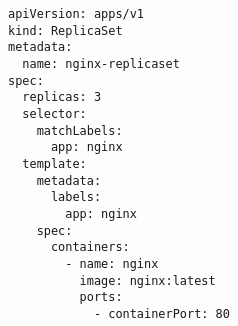 \begin{verbatim}
apiVersion: apps/v1
kind: ReplicaSet
metadata:
  name: nginx-replicaset
spec:
  replicas: 3
  selector:
    matchLabels:
      app: nginx
  template:
    metadata:
      labels:
        app: nginx
    spec:
      containers:
        - name: nginx
          image: nginx:latest
          ports:
            - containerPort: 80

\end{verbatim}